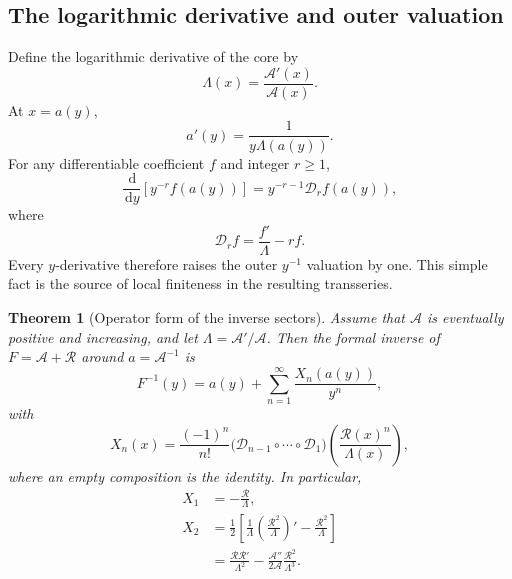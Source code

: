 \documentclass[11pt,a4paper]{article}
\numberwithin{equation}{section}
\newtheorem{theorem}{Theorem}[section]
\theoremstyle{definition}
\theoremstyle{remark}
\newcommand{\dd}{\,\mathrm d}
\newcommand{\Core}{\mathcal A}
\newcommand{\Lam}{\Lambda}
\newcommand{\Res}{\mathcal R}
\begin{document}
\subsection{The logarithmic derivative and outer valuation}

Define the logarithmic derivative of the core by
\begin{equation}\label{eq:Lambda-general}
 \Lam(x)=\frac{\Core'(x)}{\Core(x)}.
\end{equation}
At $x=a(y)$,
\begin{equation}\label{eq:a-prime-general}
 a'(y)=\frac1{y\Lam(a(y))}.
\end{equation}
For any differentiable coefficient $f$ and integer $r\ge1$,
\begin{equation}\label{eq:valuation-derivative}
 \frac{\dd}{\dd y}\left[y^{-r}f(a(y))\right]
 =y^{-r-1}\mathscr D_r f(a(y)),
\end{equation}
where
\begin{equation}\label{eq:D-r-general}
 \mathscr D_r f=\frac{f'}{\Lam}-rf.
\end{equation}
Every $y$-derivative therefore raises the outer $y^{-1}$ valuation by one.
This simple fact is the source of local finiteness in the resulting
transseries.

\begin{theorem}[Operator form of the inverse sectors]
\label{thm:operator-sectors}
Assume that $\Core$ is eventually positive and increasing, and let
$\Lam=\Core'/\Core$.  Then the formal inverse of
$F=\Core+\Res$ around $a=\Core^{-1}$ is
\begin{equation}\label{eq:general-sector-expansion}
 F^{-1}(y)=a(y)+\sum_{n=1}^{\infty}\frac{X_n(a(y))}{y^n},
\end{equation}
with
\begin{equation}\label{eq:Xn-general}
 \boxed{\quad
 X_n(x)=\frac{(-1)^n}{n!}
 \bigl(\mathscr D_{n-1}\circ\cdots\circ\mathscr D_1\bigr)
 \left(\frac{\Res(x)^n}{\Lam(x)}\right),
 \quad}
\end{equation}
where an empty composition is the identity.  In particular,
\begin{align}
 X_1&=-\frac{\Res}{\Lam},\label{eq:X1-general}\\
 X_2&=\frac12\left[
 \frac1\Lam\left(\frac{\Res^2}{\Lam}\right)'
 -\frac{\Res^2}{\Lam}\right]\label{eq:X2-general-a}\\
 &=\frac{\Res\Res'}{\Lam^2}
 -\frac{\Core''}{2\Core}\frac{\Res^2}{\Lam^3}.
 \label{eq:X2-general-b}
\end{align}
\end{theorem}
\end{document}
